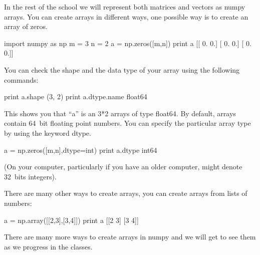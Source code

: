 \begin{exercise}
In the rest of the school we will represent both matrices and vectors as numpy arrays.
You can create arrays in different ways, one possible way is to create an array of zeros. 
\begin{python}
import numpy as np
m = 3
n = 2
a = np.zeros([m,n])
print a 
[[ 0.  0.]
 [ 0.  0.]
 [ 0.  0.]]
\end{python}

You can check the shape and the data type of your array using the following commands:
\begin{python}
print a.shape
(3, 2)
print a.dtype.name
float64
\end{python}
This shows you that ``a'' is an 3*2 arrays of type float64. By default, arrays
contain 64~bit floating point numbers. You can specify the particular array
type by using the keyword dtype.

\begin{python}
a = np.zeros([m,n],dtype=int)
print a.dtype
int64
\end{python}
(On your computer, particularly if you have an older computer,  might
denote 32~bits integers).

\smallskip

There are many other ways to create arrays, you can create arrays from lists of numbers:
\begin{python}
a = np.array([[2,3],[3,4]])
print a
[[2 3]
 [3 4]]
\end{python}

There are many more ways to create arrays in numpy and we will get to see them as we progress in the classes.

\end{exercise}

